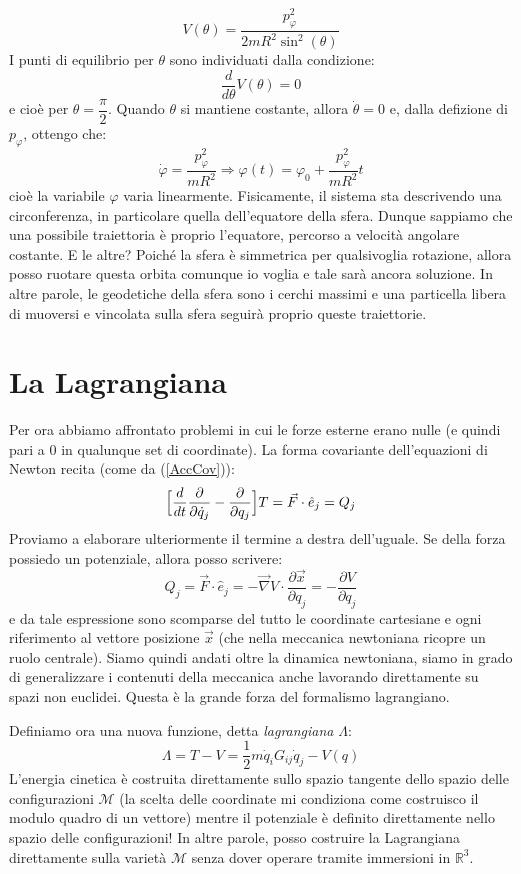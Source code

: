 \documentclass[a4paper,openany]{article}
\begin{document}
	$$
	V(\theta) = \dfrac{p_{\varphi}^{2}}{2mR^{2}\sin^{2}(\theta)}
	$$
	I punti di equilibrio per $\theta$ sono individuati dalla condizione:
	$$
	\dfrac{d}{d\theta}V(\theta) = 0
	$$
	e cioè per $\theta = \dfrac{\pi}{2}$. Quando $\theta$ si mantiene costante, allora $\dot{\theta} = 0$ e, dalla defizione di $p_\varphi$, ottengo che:
	$$
	\dot{\varphi} = \dfrac{p_{\varphi}^2}{mR^2} \Longrightarrow \varphi(t) = \varphi_{0}+\dfrac{p_{\varphi}^2}{mR^2}t
	$$
	cioè la variabile $\varphi$ varia linearmente. Fisicamente, il sistema sta descrivendo una circonferenza, in particolare quella dell'equatore della sfera. Dunque sappiamo che una possibile traiettoria è proprio l'equatore, percorso a velocità angolare costante. E le altre? Poiché la sfera è simmetrica per qualsivoglia rotazione, allora posso ruotare questa orbita comunque io voglia e tale sarà ancora soluzione. In altre parole, le geodetiche della sfera sono i cerchi massimi e una particella libera di muoversi e vincolata sulla sfera seguirà proprio queste traiettorie.
	\newpage 
	\section{La Lagrangiana}
	Per ora abbiamo affrontato problemi in cui le forze esterne erano nulle (e quindi pari a 0 in qualunque set di coordinate). La forma covariante dell'equazioni di Newton recita (come da (\ref{AccCov})):
	\begin{equation} \Bigl[\dfrac{d}{dt}\dfrac{\partial }{\partial \dot{q}_{j}}-\dfrac{\partial }{\partial q_{j}}\Bigl]T = \vec{F}\cdot\hat{e}_{j} = Q_{j}
	\end{equation}
	Proviamo a elaborare ulteriormente il termine a destra dell'uguale. Se della forza possiedo un potenziale, allora posso scrivere:
	\begin{equation}
		Q_{j} = \vec{F}\cdot\hat{e}_{j} = -\vec{\nabla }V\cdot\dfrac{\partial \vec{x}}{\partial q_{j}} = -\dfrac{\partial V}{\partial q_{j}}
	\end{equation}
	e da tale espressione sono scomparse del tutto le coordinate cartesiane e ogni riferimento al vettore posizione $\vec{x}$ (che nella meccanica newtoniana ricopre un ruolo centrale). Siamo quindi andati oltre la dinamica newtoniana, siamo in grado di generalizzare i contenuti della meccanica anche lavorando direttamente su spazi non euclidei. Questa è la grande forza del formalismo lagrangiano.
	
	Definiamo ora una nuova funzione, detta \textit{lagrangiana} $\Lambda$:
	\begin{equation}
		\Lambda = T - V = \dfrac{1}{2}m\dot{q}_{i}G_{ij}\dot{q}_{j} - V(q)
	\end{equation}
	L'energia cinetica è costruita direttamente sullo spazio tangente dello spazio delle configurazioni $\mathcal{M}$ (la scelta delle coordinate mi condiziona come costruisco il modulo quadro di un vettore) mentre il potenziale è definito direttamente nello spazio delle configurazioni! In altre parole, posso costruire la Lagrangiana direttamente sulla varietà $\mathcal{M}$ senza dover operare tramite immersioni in $\mathbb{R}^3$.
	
\end{document}
